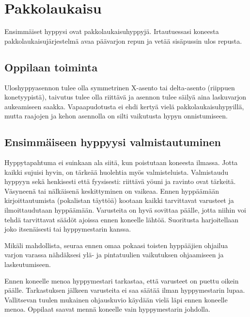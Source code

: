 \section{ Pakkolaukaisu }
\label{pl-alkeiskoulutuksen-suoritukset-pakkolaukaisu}


Ensimmäiset hyppysi ovat pakkolaukaisuhyppyjä. Irtautuessasi koneesta pakkolaukaisujärjestelmä avaa päävarjon repun ja vetää sisäpussin ulos repusta. 

\subsection{ Oppilaan toiminta }
\label{pl-alkeiskoulutuksen-suoritukset-oppilaan-toiminta}


Uloshyppyasennon tulee olla symmetrinen X-asento tai delta-asento (riippuen konetyypistä), taivutus tulee olla riittävä ja asennon tulee säilyä aina laskuvarjon aukeamiseen saakka. Vapaapudotusta ei ehdi kertyä vielä pakkolaukaisuhypyillä, mutta raajojen ja kehon asennolla on silti vaikutusta hypyn onnistumiseen. 

\subsection{ Ensimmäiseen hyppyysi valmistautuminen }
\label{pl-alkeiskoulutuksen-suoritukset-ensimmaiseen-hyppyysi-valmistautuminen}


Hyppytapahtuma ei suinkaan ala siitä, kun poistutaan koneesta ilmassa. Jotta kaikki sujuisi hyvin, on tärkeää huolehtia myös valmisteluista. Valmistaudu hyppyyn sekä henkisesti että fyysisesti: riittävä yöuni ja ravinto ovat tärkeitä. Väsyneenä tai nälkäisenä keskittyminen on vaikeaa. Ennen hyppäämään kirjoittautumista (pokalistan täyttöä) kootaan kaikki tarvittavat varusteet ja ilmoittaudutaan hyppäämään. Varusteita on hyvä sovittaa päälle, jotta niihin voi tehdä tarvittavat säädöt ajoissa ennen koneelle lähtöä. Suoritusta harjoitellaan joko itsenäisesti tai hyppymestarin kanssa. 


Mikäli mahdollista, seuraa ennen omaa pokaasi toisten hyppääjien ohjailua varjon varassa nähdäksesi ylä- ja pintatuulien vaikutuksen ohjaamiseen ja laskeutumiseen. 


Ennen koneelle menoa hyppymestari tarkastaa, että varusteet on puettu oikein päälle. Tarkastuksen jälkeen varusteita ei saa säätää ilman hyppymestarin lupaa. Vallitsevan tuulen mukainen ohjauskuvio käydään vielä läpi ennen koneelle menoa. Oppilaat saavat mennä koneelle vain hyppymestarin johdolla. 

